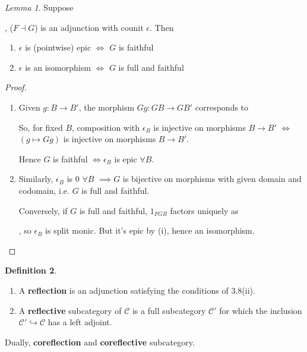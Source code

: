 \documentclass[a4paper]{article}
\theoremstyle{definition}
\newtheorem{definition}{Definition}
\theoremstyle{remark}
\theoremstyle{default}
\newtheorem{lemma}[definition]{Lemma}
\numberwithin{definition}{section}
\begin{document}
\begin{lemma}
	Suppose
	,
	($F \dashv G$) is an adjunction with counit $\epsilon$.
	Then
	\begin{enumerate}[label=\roman*.]
		\item $\epsilon$ is (pointwise) epic $\iff$ $G$ is faithful
		\item $\epsilon$ is an isomorphism $\iff$ $G$ is full and faithful
	\end{enumerate} 
\end{lemma}
\begin{proof}
	\begin{enumerate}[label=\roman*.]
		\item Given $g: B \to B'$,
		the morphism $Gg: GB \to GB'$ corresponds to
		\begin{center}
		\end{center}
		So, for fixed $B$,
		composition with $\epsilon_B$ is injective on morphisms $B \to B'$
		$\iff$ $(g \mapsto Gg)$ is injective on morphisms $B \to B'$.
		
		Hence $G$ is faithful $\iff \epsilon_B$ is epic $\forall B$.
		
		\item Similarly, $\epsilon_B$ is 0 $\forall B$
		$\implies G$ is bijective on morphisms with given domain and codomain,
		i.e. $G$ is full and faithful.
		
		Conversely, if $G$ is full and faithful,
		$1_{FGB}$ factors uniquely as \newline
		,
		so $\epsilon_B$ is split monic.
		But it's epic by (i), hence an isomorphism.
	\end{enumerate}
\end{proof}

\begin{definition}
	\begin{enumerate}[label=\roman*.]
		\item A \textbf{reflection} is an adjunction satisfying the conditions of 3.8(ii).
		\item A \textbf{reflective} subcategory of $\mathcal{C}$ is a full subcategory $\mathcal{C}'$
		for which the inclusion $\mathcal{C}' \hookrightarrow \mathcal{C}$ has a left adjoint.
	\end{enumerate}
	
	Dually, \textbf{coreflection} and \textbf{coreflective} subcategory.
\end{definition}
\end{document}
